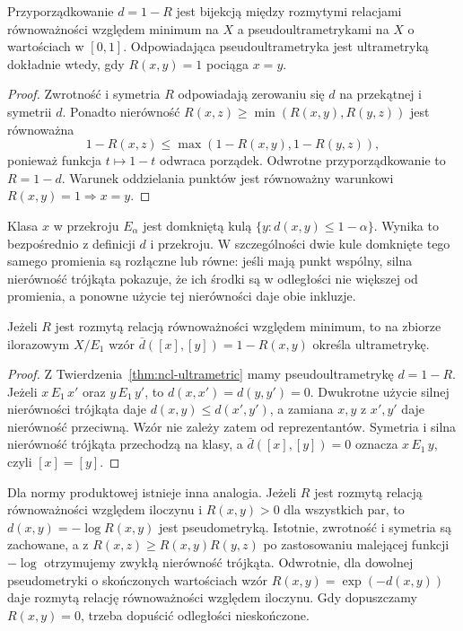 \begin{twierdzenie}
\label{thm:ncl-ultrametric}
Przyporządkowanie $d=1-R$ jest bijekcją między
rozmytymi relacjami równoważności względem minimum
na $X$ a pseudoultrametrykami na $X$ o wartościach
w $[0,1]$. Odpowiadająca pseudoultrametryka jest
ultrametryką dokładnie wtedy, gdy $R(x,y)=1$
pociąga $x=y$.
\end{twierdzenie}
\begin{proof}
Zwrotność i symetria $R$ odpowiadają zerowaniu się
$d$ na przekątnej i symetrii $d$. Ponadto nierówność
$R(x,z)\geq\min(R(x,y),R(y,z))$ jest równoważna
\[
 1-R(x,z)\leq\max(1-R(x,y),1-R(y,z)),
\]
ponieważ funkcja $t\mapsto1-t$ odwraca porządek.
Odwrotne przyporządkowanie to $R=1-d$.
Warunek oddzielania punktów jest równoważny
warunkowi $R(x,y)=1\Rightarrow x=y$.
\end{proof}
Klasa $x$ w przekroju $E_\alpha$ jest domkniętą
kulą $\{y:d(x,y)\leq1-\alpha\}$. Wynika to
bezpośrednio z definicji $d$ i przekroju.
W szczególności dwie kule domknięte tego samego
promienia są rozłączne lub równe: jeśli mają punkt
wspólny, silna nierówność trójkąta pokazuje, że
ich środki są w odległości nie większej od promienia,
a ponowne użycie tej nierówności daje obie inkluzje.

\begin{wniosek}
\label{cor:ncl-ultrametric-quotient}
Jeżeli $R$ jest rozmytą relacją równoważności względem
minimum, to na zbiorze ilorazowym $X/E_1$ wzór
$\bar d([x],[y])=1-R(x,y)$ określa ultrametrykę.
\end{wniosek}
\begin{proof}
Z Twierdzenia~\ref{thm:ncl-ultrametric} mamy
pseudoultrametrykę $d=1-R$.
Jeżeli $x\,E_1\,x'$ oraz $y\,E_1\,y'$, to
$d(x,x')=d(y,y')=0$. Dwukrotne użycie silnej
nierówności trójkąta daje
$d(x,y)\leq d(x',y')$, a zamiana $x,y$ z $x',y'$ daje nierówność przeciwną.
Wzór nie zależy zatem od reprezentantów.
Symetria i silna nierówność trójkąta przechodzą
na klasy, a $\bar d([x],[y])=0$ oznacza $x\,E_1\,y$,
czyli $[x]=[y]$.
\end{proof}

Dla normy produktowej istnieje inna analogia.
Jeżeli $R$ jest rozmytą relacją równoważności
względem iloczynu i $R(x,y)>0$ dla wszystkich
par, to $d(x,y)=-\log R(x,y)$ jest pseudometryką.
Istotnie, zwrotność i symetria są zachowane,
a z $R(x,z)\geq R(x,y)R(y,z)$ po zastosowaniu
malejącej funkcji $-\log$ otrzymujemy zwykłą
nierówność trójkąta. Odwrotnie, dla dowolnej
pseudometryki o skończonych wartościach wzór
$R(x,y)=\exp(-d(x,y))$ daje rozmytą relację
równoważności względem iloczynu. Gdy dopuszczamy
$R(x,y)=0$, trzeba dopuścić odległości nieskończone.

